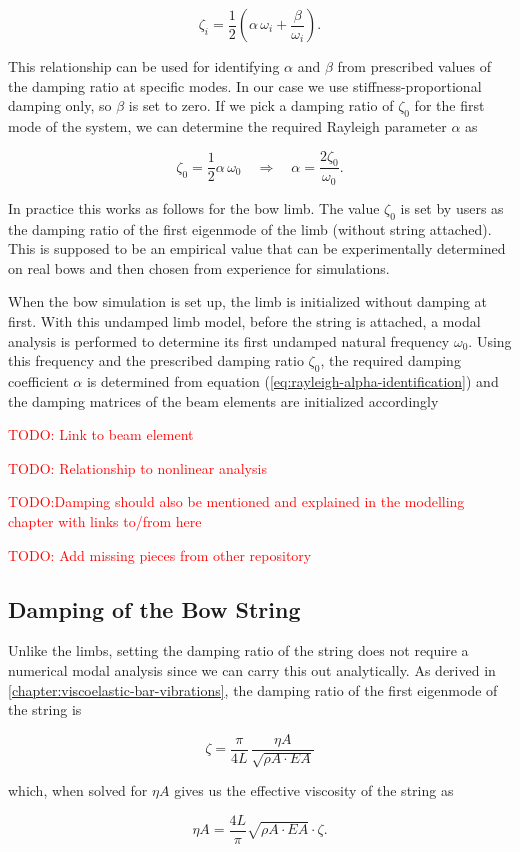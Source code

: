 \begin{equation}
\zeta_{i} = \frac{1}{2}\left(\alpha\,\omega_{i} + \frac{\beta}{\omega_{i}}\right).
\end{equation}

This relationship can be used for identifying $\alpha$ and $\beta$ from prescribed values of the damping ratio at specific modes.
In our case we use stiffness-proportional damping only, so $\beta$ is set to zero.
If we pick a damping ratio of $\zeta_{0}$ for the first mode of the system, we can determine the required Rayleigh parameter $\alpha$ as

\begin{equation}
\zeta_{0} = \frac{1}{2}\alpha\,\omega_{0} \quad \Rightarrow \quad \alpha = \frac{2\zeta_{0}}{\omega_{0}}. \label{eq:rayleigh-alpha-identification}
\end{equation}

In practice this works as follows for the bow limb.
The value $\zeta_{0}$ is set by users as the damping ratio of the first eigenmode of the limb (without string attached).
This is supposed to be an empirical value that can be experimentally determined on real bows and then chosen from experience for simulations.

When the bow simulation is set up, the limb is initialized without damping at first.
With this undamped limb model, before the string is attached, a modal analysis is performed to determine its first undamped natural frequency $\omega_{0}$.
Using this frequency and the prescribed damping ratio $\zeta_{0}$, the required damping coefficient $\alpha$ is determined from equation (\ref{eq:rayleigh-alpha-identification}) and the damping matrices of the beam elements are initialized accordingly

\textcolor{red}{TODO: Link to beam element}

\textcolor{red}{TODO: Relationship to nonlinear analysis}

\textcolor{red}{TODO:Damping should also be mentioned and explained in the modelling chapter with links to/from here}

\textcolor{red}{TODO: Add missing pieces from other repository}

\subsection{Damping of the Bow String}

Unlike the limbs, setting the damping ratio of the string does not require a numerical modal analysis since we can carry this out analytically.
As derived in \ref{chapter:viscoelastic-bar-vibrations}, the damping ratio of the first eigenmode of the string is

\begin{equation}
\zeta = \frac{\pi}{4L}\,\frac{\eta A}{\sqrt{\rho A \cdot EA}}
\end{equation}

which, when solved for $\eta A$ gives us the effective viscosity of the string as

\begin{equation}
\eta A = \frac{4L}{\pi}\sqrt{\rho A \cdot EA}\cdot\zeta.
\end{equation}